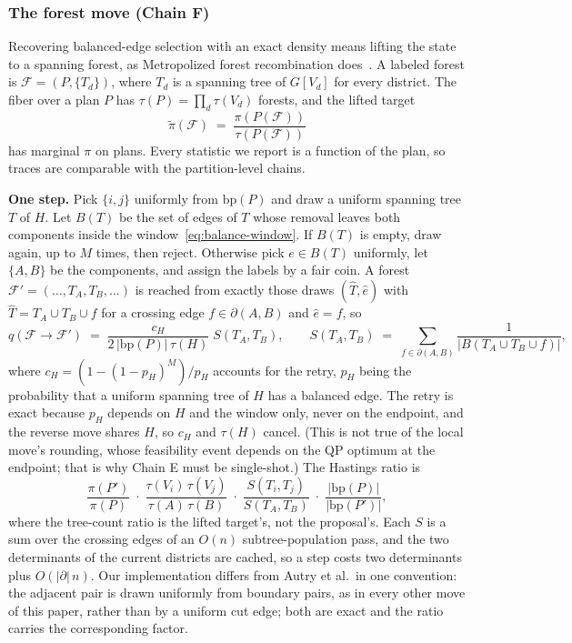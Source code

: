 \documentclass[11pt]{article}
\begin{document}
\subsubsection{The forest move (Chain F)}\label{sec:forest}

Recovering balanced-edge selection with an exact density means
lifting the state to a spanning forest, as Metropolized forest
recombination does~\cite{autry2023metropolized}. A labeled forest is
$\mathcal{F} = (P, \{T_d\})$, where $T_d$ is a spanning tree of
$G[V_d]$ for every district. The fiber over a plan $P$ has
$\tau(P) = \prod_d \tau(V_d)$ forests, and the lifted target
\begin{equation}\label{eq:lifted-target}
  \tilde\pi(\mathcal{F}) \;=\; \frac{\pi(P(\mathcal{F}))}{\tau(P(\mathcal{F}))}
\end{equation}
has marginal $\pi$ on plans. Every statistic we report is a function
of the plan, so traces are comparable with the partition-level
chains.

\textbf{One step.} Pick $\{i,j\}$ uniformly from $\mathrm{bp}(P)$ and
draw a uniform spanning tree $T$ of $H$. Let $B(T)$ be the set of
edges of $T$ whose removal leaves both components inside the
window~\eqref{eq:balance-window}. If $B(T)$ is empty, draw again, up
to $M$ times, then reject. Otherwise pick $e \in B(T)$ uniformly, let
$\{A, B\}$ be the components, and assign the labels by a fair coin. A
forest $\mathcal{F}' = (\ldots, T_A, T_B, \ldots)$ is reached from
exactly those draws $(\hat T, \hat e)$ with $\hat T = T_A \cup T_B \cup f$
for a crossing edge $f \in \partial(A,B)$ and $\hat e = f$, so
\begin{equation}\label{eq:forest-q}
  q(\mathcal{F} \to \mathcal{F}') \;=\;
  \frac{c_H}{2\,|\mathrm{bp}(P)|\,\tau(H)}\; S(T_A, T_B),
  \qquad
  S(T_A, T_B) \;=\; \sum_{f \in \partial(A,B)} \frac{1}{|B(T_A \cup T_B \cup f)|},
\end{equation}
where $c_H = (1 - (1 - p_H)^M)/p_H$ accounts for the retry, $p_H$
being the probability that a uniform spanning tree of $H$ has a
balanced edge. The retry is exact because $p_H$ depends on $H$ and
the window only, never on the endpoint, and the reverse move shares
$H$, so $c_H$ and $\tau(H)$ cancel. (This is not true of the local
move's rounding, whose feasibility event depends on the QP optimum at
the endpoint; that is why Chain E must be single-shot.) The Hastings
ratio is
\begin{equation}\label{eq:forest-ratio}
  \frac{\pi(P')}{\pi(P)}\;\cdot\;
  \frac{\tau(V_i)\,\tau(V_j)}{\tau(A)\,\tau(B)}\;\cdot\;
  \frac{S(T_i, T_j)}{S(T_A, T_B)}\;\cdot\;
  \frac{|\mathrm{bp}(P)|}{|\mathrm{bp}(P')|},
\end{equation}
where the tree-count ratio is the lifted target's, not the
proposal's. Each $S$ is a sum over the crossing edges of an $O(n)$
subtree-population pass, and the two determinants of the current
districts are cached, so a step costs two determinants plus
$O(|\partial|\, n)$. Our implementation differs from Autry et al.\ in
one convention: the adjacent pair is drawn uniformly from boundary
pairs, as in every other move of this paper, rather than by a uniform
cut edge; both are exact and the ratio carries the corresponding
factor.
\end{document}
